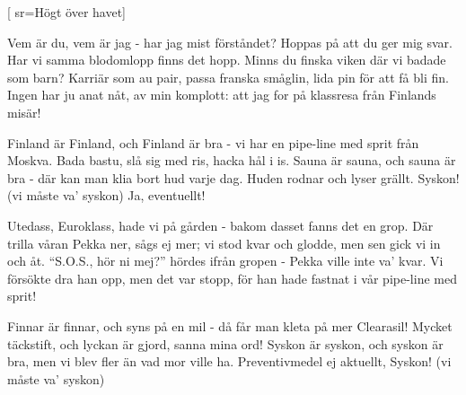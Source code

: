 

[
sr={Högt över havet}]

\beginverse*
Vem är du, vem är jag -
har jag mist förståndet?
Hoppas på att du ger mig svar.
Har vi samma blodomlopp
finns det hopp.
Minns du finska viken där vi badade som barn?
Karriär som au pair, 
passa franska småglin,
lida pin för att få bli fin.
Ingen har ju anat nåt,
av min komplott:
att jag for på klassresa från Finlands misär!
\endverse

\beginchorus
Finland är Finland, och Finland är bra - 
vi har en pipe-line med sprit från Moskva.
Bada bastu, slå sig med ris,
hacka hål i is.
Sauna är sauna, och sauna är bra -
där kan man klia bort hud varje dag.
Huden rodnar och lyser grällt.
Syskon! (vi måste va' syskon)
Ja, eventuellt!
\endchorus

\newpage
\beginverse*
Utedass, Euroklass,
hade vi på gården - 
bakom dasset fanns det en grop.
Där trilla våran Pekka ner,
sågs ej mer;
vi stod kvar och glodde, men sen gick vi in och åt.
``S.O.S., hör ni mej?'' hördes ifrån gropen -
Pekka ville inte va' kvar.
Vi försökte dra han opp,
men det var stopp,
för han hade fastnat i vår pipe-line med sprit!
\endverse

\beginchorus
Finnar är finnar, och syns på en mil -
då får man kleta på mer Clearasil!
Mycket täckstift, och lyckan är gjord,
sanna mina ord!
Syskon är syskon, och syskon är bra,
men vi blev fler än vad mor ville ha.
Preventivmedel ej aktuellt,
Syskon! (vi måste va' syskon)
\endchorus
\endsong


